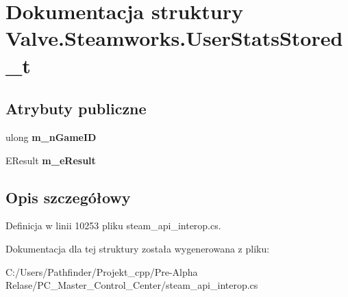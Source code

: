 \hypertarget{struct_valve_1_1_steamworks_1_1_user_stats_stored__t}{}\section{Dokumentacja struktury Valve.\+Steamworks.\+User\+Stats\+Stored\+\_\+t}
\label{struct_valve_1_1_steamworks_1_1_user_stats_stored__t}
\subsection*{Atrybuty publiczne}
\begin{DoxyCompactItemize}
\item 
\mbox{\label{struct_valve_1_1_steamworks_1_1_user_stats_stored__t_afa6a112c8399a9c590fa359bc2c2592b}} 
ulong {\bfseries m\+\_\+n\+Game\+ID}
\item 
\mbox{\label{struct_valve_1_1_steamworks_1_1_user_stats_stored__t_a500bd71fec5d025cdc2440e7f1810dee}} 
E\+Result {\bfseries m\+\_\+e\+Result}
\end{DoxyCompactItemize}


\subsection{Opis szczegółowy}


Definicja w linii 10253 pliku steam\+\_\+api\+\_\+interop.\+cs.



Dokumentacja dla tej struktury została wygenerowana z pliku\+:\begin{DoxyCompactItemize}
\item 
C\+:/\+Users/\+Pathfinder/\+Projekt\+\_\+cpp/\+Pre-\/\+Alpha Relase/\+P\+C\+\_\+\+Master\+\_\+\+Control\+\_\+\+Center/steam\+\_\+api\+\_\+interop.\+cs\end{DoxyCompactItemize}
